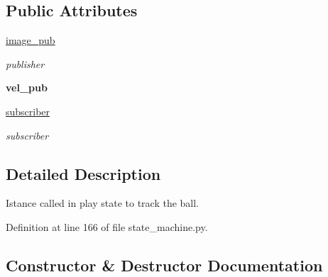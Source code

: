 \subsection*{Public Attributes}
\begin{DoxyCompactItemize}
\item 
\mbox{\label{classstate__machine_1_1image__feature_a5a1cb2faa11bce8e72056515c3452bbe}} 
\hyperlink{classstate__machine_1_1image__feature_a5a1cb2faa11bce8e72056515c3452bbe}{image\+\_\+pub}
\begin{DoxyCompactList}\small\item\em publisher \end{DoxyCompactList}\item 
\mbox{\label{classstate__machine_1_1image__feature_a62bc4749ef4e529d537db05de41bc246}} 
{\bfseries vel\+\_\+pub}
\item 
\mbox{\label{classstate__machine_1_1image__feature_a5cb84378b3934b77d49a2938e13a6182}} 
\hyperlink{classstate__machine_1_1image__feature_a5cb84378b3934b77d49a2938e13a6182}{subscriber}
\begin{DoxyCompactList}\small\item\em subscriber \end{DoxyCompactList}\end{DoxyCompactItemize}


\subsection{Detailed Description}
Istance called in play state to track the ball. 

Definition at line 166 of file state\+\_\+machine.\+py.



\subsection{Constructor \& Destructor Documentation}
\mbox{\label{classstate__machine_1_1image__feature_a719ee46dbe292cfe76d9b20b3d752b9e}} 
